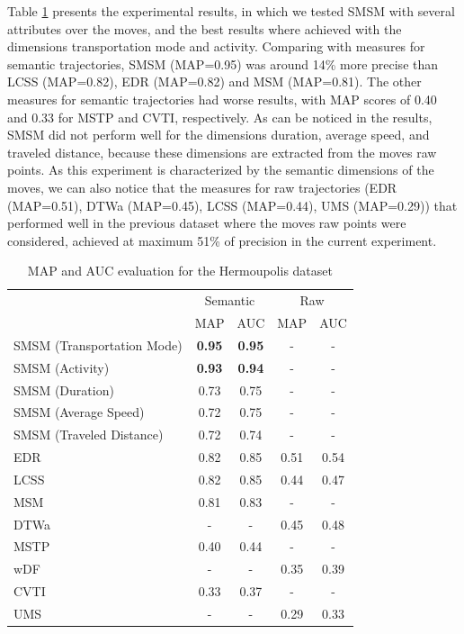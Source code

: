 {Table {\ref{tab:hermoupolis_measures_map_auc}} presents the experimental results, in which we tested SMSM with several  attributes over the moves, and the best results where achieved with the dimensions transportation mode and activity. Comparing with measures for semantic trajectories, SMSM (MAP=0.95) was around 14\% more precise than LCSS (MAP=0.82), EDR (MAP=0.82) and MSM (MAP=0.81). The other measures for semantic trajectories had worse results, with MAP scores of 0.40 and 0.33 for MSTP and CVTI, respectively. As can be noticed in the results,  SMSM did not perform well for the dimensions duration, average speed, and traveled distance, because these dimensions are extracted from the moves raw points. As this experiment is characterized by the semantic dimensions of the moves, we can also notice that the measures for raw trajectories (EDR (MAP=0.51), DTWa (MAP=0.45), LCSS (MAP=0.44), UMS (MAP=0.29)) that performed well in the previous dataset where the moves raw points were considered, achieved at maximum 51\% of precision in the current experiment.}


\begin{table}[h]
\scriptsize
  \centering
  \begin{tabular}{|l|c|c|c|c|}
  \hline
 & \multicolumn{2}{c}{Semantic} & \multicolumn{2}{|c|}{Raw} \\
 	\cline{2-5}
 & MAP & AUC & MAP & AUC \\
  \hline
SMSM (Transportation Mode)& \textbf{0.95} & \textbf{0.95} & - & -\\
SMSM (Activity)& \textbf{0.93} & \textbf{0.94} & - & -\\
SMSM (Duration)& 0.73 & 0.75 & - & -\\
SMSM (Average Speed)& 0.72 & 0.75 & - & -\\
SMSM (Traveled Distance)& 0.72 & 0.74 & - & -\\
EDR & 0.82 & 0.85 & 0.51 & 0.54 \\
LCSS & 0.82 & 0.85 & 0.44 & 0.47 \\
MSM & 0.81 & 0.83 & - & - \\
DTWa & - & - & 0.45 & 0.48 \\
MSTP & 0.40 & 0.44 & - & - \\
wDF & - & - & 0.35 & 0.39 \\
CVTI & 0.33 & 0.37 & - & - \\
UMS & - & - & 0.29 & 0.33 \\
    \hline
  \end{tabular}
  \caption{MAP and AUC evaluation for the Hermoupolis dataset}
  \label{tab:hermoupolis_measures_map_auc}
\end{table}

